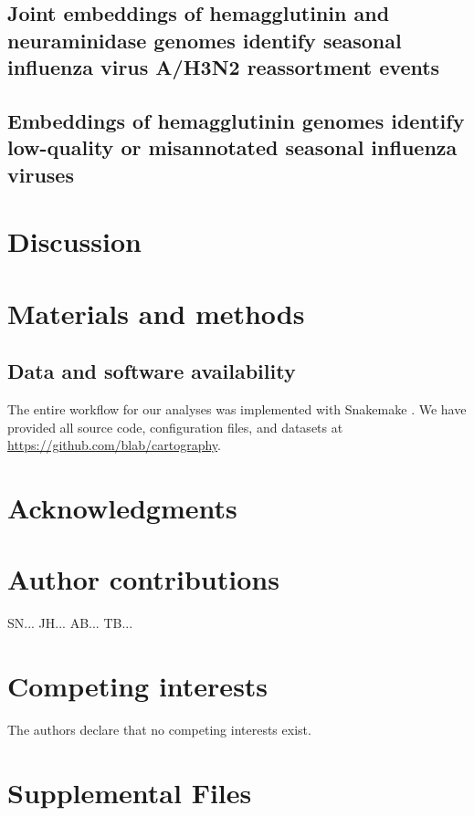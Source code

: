 \documentclass[9pt,lineno]{elife}
\begin{document}
\subsection*{Joint embeddings of hemagglutinin and neuraminidase genomes identify seasonal influenza virus A/H3N2 reassortment events}

\subsection*{Embeddings of hemagglutinin genomes identify low-quality or misannotated seasonal influenza viruses}

\section*{Discussion}

\section*{Materials and methods}

\subsection*{Data and software availability}

The entire workflow for our analyses was implemented with Snakemake \citep{molder_2021}.
We have provided all source code, configuration files, and datasets at \href{https://github.com/blab/cartography}{https://github.com/blab/cartography}.

\section*{Acknowledgments}

\section*{Author contributions}

SN...
JH...
AB...
TB...

\section*{Competing interests}

The authors declare that no competing interests exist.

\section*{Supplemental Files}


\end{document}
